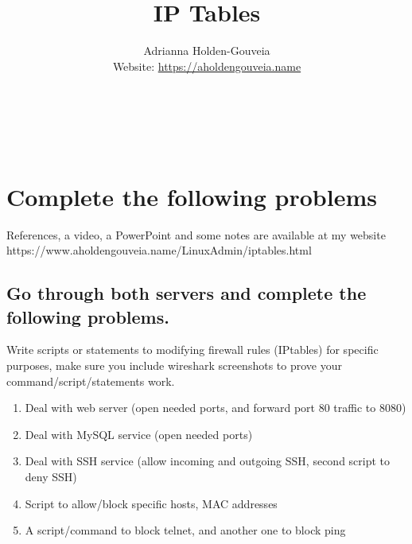 \documentclass[12pt]{article}
\title{IP Tables}
\author{
        Adrianna Holden-Gouveia \\
        Website: \url{https://aholdengouveia.name}\\ 
        \date{\vspace{-5ex}}
        \faLinkedin{: aholdengouveia} \\
        \faGithub {: aholdengouveia} \\
        \faTwitter {: aholdengouveia} \\
        }
\begin{document}
    

\maketitle


\section*{Complete the following problems}

References, a video, a PowerPoint and some notes are available at my website
https://www.aholdengouveia.name/LinuxAdmin/iptables.html

\subsection*{Go through both servers and complete the following problems.  }

Write scripts or statements to modifying firewall rules (IPtables) for specific purposes, make sure you include wireshark screenshots to prove your command/script/statements work. 
    \begin{enumerate}
        \item Deal with web server (open needed ports, and forward port 80 traffic to 8080) 
        \item Deal with MySQL service (open needed ports)
        \item Deal with SSH service (allow incoming and outgoing SSH, second script to deny SSH)
        \item Script to allow/block specific hosts, MAC addresses
        \item A script/command to block telnet, and another one to block ping
    \end{enumerate} 
\end{document}
